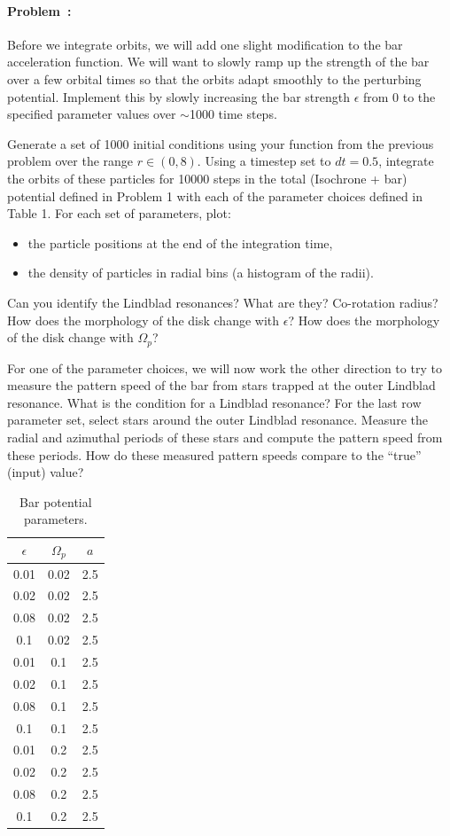 \documentclass[12pt,twoside]{article}
\newcommand{\problemname}{Problem}
\newcounter{problem}
\newenvironment{problem}{\paragraph{\problemname~\theproblem:}\refstepcounter{problem}}{}
\begin{document}
\begin{problem}

Before we integrate orbits, we will add one slight modification to the bar acceleration function. We will want to slowly ramp up the strength of the bar over a few orbital times so that the orbits adapt smoothly to the perturbing potential. Implement this by slowly increasing the bar strength $\epsilon$ from 0 to the specified parameter values over $\sim$1000 time steps.

Generate a set of 1000 initial conditions using your function from the previous problem over the range $r\in(0,8)$. Using a timestep set to $dt = 0.5$, integrate the orbits of these particles for 10000 steps in the total (Isochrone + bar) potential defined in Problem 1 with each of the parameter choices defined in Table 1. For each set of parameters, plot:
\begin{itemize}
\item the particle positions at the end of the integration time,
\item the density of particles in radial bins (a histogram of the radii).
\end{itemize}
Can you identify the Lindblad resonances? What are they? Co-rotation radius? How does the morphology of the disk change with $\epsilon$? How does the morphology of the disk change with $\Omega_p$?

For one of the parameter choices, we will now work the other direction to try to measure the pattern speed of the bar from stars trapped at the outer Lindblad resonance. What is the condition for a Lindblad resonance? For the last row parameter set, select stars around the outer Lindblad resonance. Measure the radial and azimuthal periods of these stars and compute the pattern speed from these periods. How do these measured pattern speeds compare to the ``true'' (input) value?

\begin{table}
\centering
\begin{tabular}{c c c}
$\epsilon$ & $\Omega_p$ & $a$ \\
\hline
0.01 & 0.02 & 2.5 \\
0.02 & 0.02 & 2.5 \\
0.08 & 0.02 & 2.5 \\
0.1 & 0.02 & 2.5 \\
0.01 & 0.1 & 2.5 \\
0.02 & 0.1 & 2.5 \\
0.08 & 0.1 & 2.5 \\
0.1 & 0.1 & 2.5 \\
0.01 & 0.2 & 2.5 \\
0.02 & 0.2 & 2.5 \\
0.08 & 0.2 & 2.5 \\
0.1 & 0.2 & 2.5 
\end{tabular}
\caption{Bar potential parameters.}
\end{table}

\end{problem}
\end{document}

